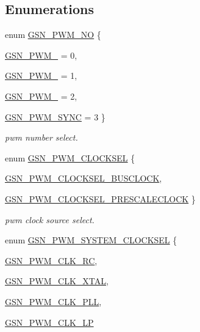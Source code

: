 \subsection*{Enumerations}
\begin{DoxyCompactItemize}
\item 
enum \hyperlink{a00650_ga9afe1c7d571460ff2f6780bef6b433df}{GSN\_\-PWM\_\-NO} \{ \par
\hyperlink{a00650_gga9afe1c7d571460ff2f6780bef6b433dfaa98b11eb3f872045951a4d429320d108}{GSN\_\-PWM\_} =  0, 
\par
\hyperlink{a00650_gga9afe1c7d571460ff2f6780bef6b433dfae2615df5505d8686938fa54bbbff433c}{GSN\_\-PWM\_} =  1, 
\par
\hyperlink{a00650_gga9afe1c7d571460ff2f6780bef6b433dfa4929db9be22abdd0bd3698a0364a0fe0}{GSN\_\-PWM\_} =  2, 
\par
\hyperlink{a00650_gga9afe1c7d571460ff2f6780bef6b433dfaad51216337aa6e9b1ebac9acfe3305d4}{GSN\_\-PWM\_\-SYNC} =  3
 \}
\begin{DoxyCompactList}\small\item\em pwm number select. \end{DoxyCompactList}\item 
enum \hyperlink{a00650_gafda5110eb592af71b799ed22c7ebf902}{GSN\_\-PWM\_\-CLOCKSEL} \{ \par
\hyperlink{a00650_ggafda5110eb592af71b799ed22c7ebf902ac40082bae4532a6c63a739bbc5163aec}{GSN\_\-PWM\_\-CLOCKSEL\_\-BUSCLOCK}, 
\par
\hyperlink{a00650_ggafda5110eb592af71b799ed22c7ebf902a449ae8fe8e0cdf0a007d1789cebdae8d}{GSN\_\-PWM\_\-CLOCKSEL\_\-PRESCALECLOCK}
 \}
\begin{DoxyCompactList}\small\item\em pwm clock source select. \end{DoxyCompactList}\item 
enum \hyperlink{a00650_ga110e33b4ac34f5c1b7e1f1e3b27d2281}{GSN\_\-PWM\_\-SYSTEM\_\-CLOCKSEL} \{ \par
\hyperlink{a00650_gga110e33b4ac34f5c1b7e1f1e3b27d2281afd82432453c917ab0e752a1e4aeef74c}{GSN\_\-PWM\_\-CLK\_\-RC}, 
\par
\hyperlink{a00650_gga110e33b4ac34f5c1b7e1f1e3b27d2281a5fe2bd939dbc6480858e898fa3d2b5f3}{GSN\_\-PWM\_\-CLK\_\-XTAL}, 
\par
\hyperlink{a00650_gga110e33b4ac34f5c1b7e1f1e3b27d2281a21baaf60b294988a2796310d4bdc56c6}{GSN\_\-PWM\_\-CLK\_\-PLL}, 
\par
\hyperlink{a00650_gga110e33b4ac34f5c1b7e1f1e3b27d2281a8f24e9a7e26bc8cf4774484739bb0d3d}{GSN\_\-PWM\_\-CLK\_\-LP}

\end{DoxyCompactItemize}
